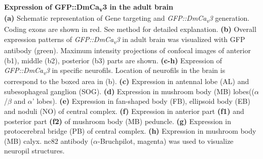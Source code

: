 \label{fig:2} 
\textbf{Expression of GFP::DmCa\textsubscript{v}3 in the adult brain} 
\\ 
\textbf{(a)} Schematic representation of Gene targeting and \emph{GFP::DmCa\textsubscript{v}3} generation. 
Coding exons are shown in red. 
See method for detailed explanation.
\textbf{(b)} Overall expression patterns of \emph{GFP::DmCa\textsubscript{v}3} in adult brain was visualized with GFP antibody (green). 
Maximum intensity projections of confocal images of anterior (b1), middle (b2), posterior (b3) parts are shown.
\textbf{(c-h)} Expression of \emph{GFP::DmCa\textsubscript{v}3} in specific neurofils. Location of neurofils in the brain is correspond to the boxed area in (b).
\textbf{(c)} Expression in antennal lobe (AL) and subesophageal ganglion (SOG).
\textbf{(d)} Expression in mushroom body (MB) lobes(($\alpha$/$\beta$ and $\alpha$\textquoteright{} lobes). 
\textbf{(e)} Expression in fan-shaped body (FB), ellipsoid body (EB) and noduli (NO) of central complex.
\textbf{(f)} Expression in anterior part \textbf{(f1)} and posterior part \textbf{(f2)} of mushroom body (MB) peduncle.
\textbf{(g)} Expression in protocerebral bridge (PB) of central complex. 
\textbf{(h)} Expression in mushroom body (MB) calyx. 
nc82  antibody ($\alpha$-Bruchpilot, magenta) was used to visualize neuropil structures. 

  
  
  
  
  
  
